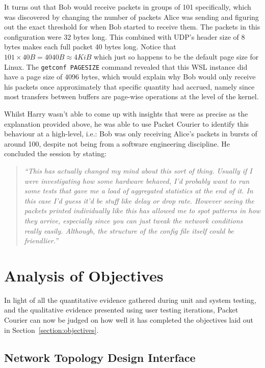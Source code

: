 It turns out that Bob would receive packets in groups of 101 specifically, which was discovered by changing the
number of packets Alice was sending and figuring out the exact threshold for when Bob started to receive them. The
packets in this configuration were 32 bytes long. This combined with UDP's header size of 8 bytes makes each full
packet 40 bytes long. Notice that $101 \times 40B = 4040B \approx 4KiB$ which just so happens to be the default page
size for Linux\cite{default_page_size}. The \texttt{getconf PAGESIZE} command\cite{linux_page_size} revealed that
this WSL instance did have a page size of 4096 bytes, which would explain why Bob would only receive his packets once
approximately that specific quantity had accrued, namely since most transfers between buffers are page-wise
operations at the level of the kernel\cite{paging}.

Whilst Harry wasn't able to come up with insights that were as precise as the explanation provided above, he was able
to use Packet Courier to identify this behaviour at a high-level, i.e.: Bob was only receiving Alice's packets in
bursts of around 100, despite not being from a software engineering discipline. He concluded the session by stating:
\begin{quote}
    \emph{``This has actually changed my mind about this sort of thing. Usually if I were investigating how some
    hardware behaved, I'd probably want to run some tests that gave me a load of aggregated statistics at the end of
    it. In this case I'd guess it'd be stuff like delay or drop rate. However seeing the packets printed individually
    like this has allowed me to spot patterns in how they arrive, especially since you can just tweak the network
    conditions really easily. Although, the structure of the config file itself could be friendlier.''}
\end{quote}


\section{Analysis of Objectives}\label{section:analysis_of_objectives}

In light of all the quantitative evidence gathered during unit and system testing, and the qualitative evidence
presented using user testing iterations, Packet Courier can now be judged on how well it has completed the objectives
laid out in Section~\ref{section:objectives}.

\subsection{Network Topology Design Interface}\label{subsection:network_topology_design_interface}

